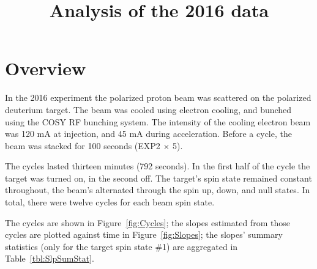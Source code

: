 \documentclass{article}
\begin{document}
	\title{Analysis of the 2016 data}
	\maketitle
	
\section{Overview}

In the 2016 experiment the polarized proton beam was scattered on the polarized deuterium target. The beam was cooled using electron cooling, and bunched using the COSY RF bunching system. The intensity of the cooling electron beam was 120 mA at injection, and 45 mA during acceleration. Before a cycle, the beam was stacked for 100 seconds (EXP2 $\times$ 5).

The cycles lasted thirteen minutes (792 seconds). In the first half of the cycle the target was turned on, in the second off. The target's spin state remained constant throughout, the beam's alternated through the spin up, down, and null states. In total, there were twelve cycles for each beam spin state. 

The cycles are shown in Figure~\ref{fig:Cycles}; the slopes estimated from those cycles are plotted against time in Figure~\ref{fig:Slopes}; the slopes' summary statistics (only for the target spin state \#1) are aggregated in Table~\ref{tbl:SlpSumStat}.
\end{document}
